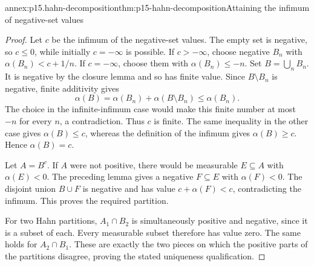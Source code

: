 \begin{annexitem}{annex:p15.hahn-decomposition}{thm:p15-hahn-decomposition}{Attaining the infimum of negative-set values}
\begin{proof}
Let \(c\) be the infimum of the negative-set values. The empty set
is negative, so \(c\leq0\), while initially \(c=-\infty\) is possible.
If \(c>-\infty\), choose negative \(B_n\) with
\(\alpha(B_n)<c+1/n\). If \(c=-\infty\), choose them with
\(\alpha(B_n)\leq-n\). Set \(B=\bigcup_nB_n\).
It is negative by the closure lemma and so has finite value.
Since \(B\setminus B_n\) is negative, finite additivity gives
\[
                   \alpha(B)=\alpha(B_n)+\alpha(B\setminus B_n)
                                      \leq\alpha(B_n).
\]
The choice in the infinite-infimum case would make this finite number
at most \(-n\) for every \(n\), a contradiction.
Thus \(c\) is finite. The same inequality in the other case gives
\(\alpha(B)\leq c\), whereas the definition of the infimum gives
\(\alpha(B)\geq c\). Hence \(\alpha(B)=c\).

Let \(A=B^c\). If \(A\) were not positive, there would be measurable
\(E\subseteq A\) with \(\alpha(E)<0\).
The preceding lemma gives a negative \(F\subseteq E\) with
\(\alpha(F)<0\). The disjoint union \(B\cup F\) is negative and
has value \(c+\alpha(F)<c\), contradicting the infimum.
This proves the required partition.

For two Hahn partitions, \(A_1\cap B_2\) is simultaneously positive
and negative, since it is a subset of each. Every measurable subset
therefore has value zero. The same holds for \(A_2\cap B_1\).
These are exactly the two pieces on which the positive parts of the
partitions disagree, proving the stated uniqueness qualification.
\end{proof}
\end{annexitem}

